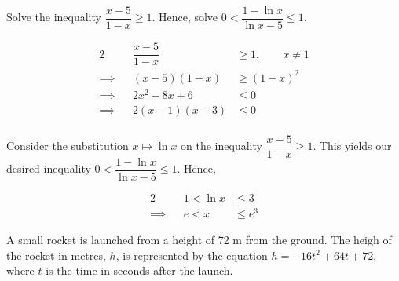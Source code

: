 \documentclass{jhwhw}
\begin{document}

    \problem{}
        Solve the inequality $\dfrac{x-5}{1-x} \geq 1$. Hence, solve $0 < \dfrac{1-\ln x}{\ln x -5} \leq 1$.

    \solution
        \begin{alignat*}{2}
            &&\dfrac{x-5}{1-x} &\geq 1, \qquad x \neq 1\\
            \implies&& (x-5)(1-x) &\geq \left(1-x\right)^2\\
            \implies&& 2x^2-8x+6 &\leq 0\\
            \implies&& 2(x-1)(x-3) &\leq 0\\
        \end{alignat*}

        \begin{center}
        \end{center}


        Consider the substitution $x \mapsto \ln x$ on the inequality $\dfrac{x-5}{1-x} \geq 1$. This yields our desired inequality $0 < \dfrac{1-\ln x}{\ln x -5} \leq 1$. Hence, 

        \begin{alignat*}{2}
            &&1 < \ln x &\leq 3 \\
            \implies&& e < x &\leq e^3
        \end{alignat*}


    \problem{}
        A small rocket is launched from a height of 72 m from the ground. The heigh of the rocket in metres, $h$, is represented by the equation $h = -16t^2 + 64t+72$, where $t$ is the time in seconds after the launch.
\end{document}

